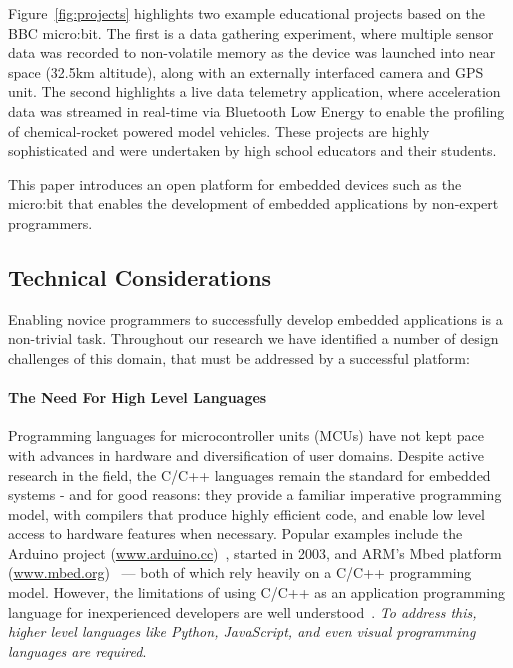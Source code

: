 Figure~\ref{fig:projects} highlights two example educational projects based on the BBC micro:bit. The first is a data gathering experiment, where multiple sensor data was recorded to non-volatile memory as the device was launched into near space (32.5km altitude), along with an externally interfaced camera and GPS unit. The second highlights a live data telemetry application, where acceleration data was streamed in real-time via Bluetooth Low Energy to enable the profiling of chemical-rocket powered model vehicles. These projects are highly sophisticated and were undertaken by high school educators and their students.

This paper introduces an open platform for embedded devices such as the micro:bit that enables the development of embedded applications by non-expert programmers.

\subsection{Technical Considerations}
\label{sec:TechnicalChallenges}
Enabling novice programmers to successfully develop embedded applications is a non-trivial task. Throughout our research we have identified a number of design challenges of this domain, that must be addressed by a successful platform:

\paragraph{The Need For High Level Languages}
Programming languages for microcontroller units (MCUs) have not kept pace with advances in hardware and diversification of user domains. Despite active research in the field, the C/C++ languages remain the standard for embedded systems - and for good reasons: they provide a familiar imperative programming model, with compilers that produce highly efficient code, and enable low level access to hardware features when necessary. Popular examples include the Arduino project (\url{www.arduino.cc})~\cite{buildingArduino2014}, started in 2003, and ARM's Mbed platform (\url{www.mbed.org})~\cite{ARMmbed} --- both of which rely heavily on a C/C++ programming model. However, the limitations of using C/C++ as an application programming language for inexperienced developers are well understood~\cite{blikstein2013gears}. \emph{To address this, higher level languages like Python, JavaScript, and even visual programming languages are required}.

